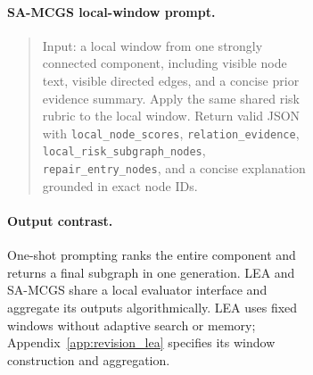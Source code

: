 \documentclass[11pt]{article}
\newcommand{\samcgs}{SA-MCGS}
\begin{document}
\begin{figure}[!t]
\begin{figure}[!t]
\paragraph{\samcgs{} local-window prompt.}
\begin{quote}
\small
Input: a local window from one strongly connected component, including visible node text, visible directed edges, and a concise prior evidence summary.  Apply the same shared risk rubric to the local window.  Return valid JSON with \texttt{local\_node\_scores}, \texttt{relation\_evidence}, \texttt{local\_risk\_subgraph\_nodes}, \texttt{repair\_entry\_nodes}, and a concise explanation grounded in exact node IDs.
\end{quote}

\paragraph{Output contrast.}
One-shot prompting ranks the entire component and returns a final subgraph in one generation. LEA and \samcgs{} share a local evaluator interface and aggregate its outputs algorithmically. LEA uses fixed windows without adaptive search or memory; Appendix~\ref{app:revision_lea} specifies its window construction and aggregation.


\end{figure}
\end{figure}
\end{document}
